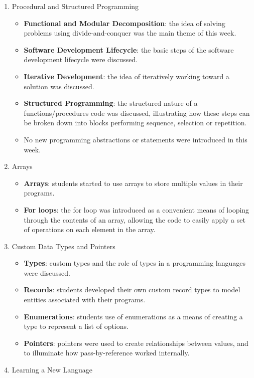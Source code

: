 \begin{enumerate}
\begin{itemize}
  \end{itemize}
  \item Procedural and Structured Programming
  \begin{itemize}[noitemsep,nolistsep]
  	\item \textbf{Functional and Modular Decomposition}: the idea of solving problems using divide-and-conquer was the main theme of this week.
  	\item \textbf{Software Development Lifecycle}: the basic steps of the software development lifecycle were discussed.
  	\item \textbf{Iterative Development}: the idea of iteratively working toward a solution was discussed.
  	\item \textbf{Structured Programming}: the structured nature of a functions/procedures code was discussed, illustrating how these steps can be broken down into blocks performing sequence, selection or repetition.
  	\item No new programming abstractions or statements were introduced in this week.
  \end{itemize}
  \item Arrays
  \begin{itemize}[noitemsep,nolistsep]
  	\item \textbf{Arrays}: students started to use arrays to store multiple values in their programs.
  	\item \textbf{For loops}: the for loop was introduced as a convenient means of looping through the contents of an array, allowing the code to easily apply a set of operations on each element in the array.
  \end{itemize}
  \item Custom Data Types and Pointers
  \begin{itemize}[noitemsep,nolistsep]
  	\item \textbf{Types}: custom types and the role of types in a programming languages were discussed.
  	\item \textbf{Records}: students developed their own custom record types to model entities associated with their programs.
  	\item \textbf{Enumerations}: students use of enumerations as a means of creating a type to represent a list of options.
  	\item \textbf{Pointers}: pointers were used to create relationships between values, and to illuminate how pass-by-reference worked internally.
  \end{itemize}
  \item Learning a New Language

\end{enumerate}
